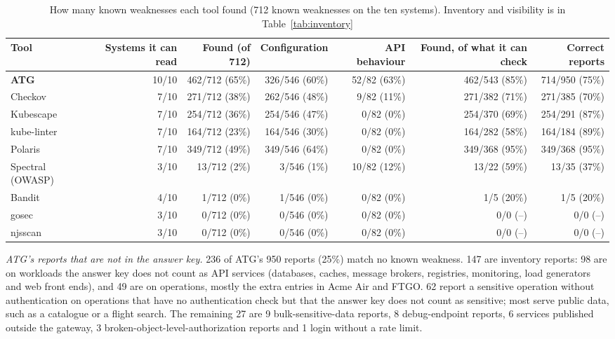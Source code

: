 \documentclass[conference]{IEEEtran}
\begin{document}
\begin{table}[!t]
\caption{How many known weaknesses each tool found (712 known weaknesses on the ten systems). Inventory and visibility is in Table~\ref{tab:inventory}}
\label{tab:tools}
\centering
\scriptsize
\setlength{\tabcolsep}{4pt}
\begin{tabular}{@{}lrrrrrr@{}}
\toprule
Tool & Systems it can read & Found (of 712) & Configuration & API behaviour & Found, of what it can check & Correct reports \\
\midrule
\textbf{ATG} & 10/10 & 462/712 (65\%) & 326/546 (60\%) & 52/82 (63\%) & 462/543 (85\%) & 714/950 (75\%) \\
Checkov & 7/10 & 271/712 (38\%) & 262/546 (48\%) & 9/82 (11\%) & 271/382 (71\%) & 271/385 (70\%) \\
Kubescape & 7/10 & 254/712 (36\%) & 254/546 (47\%) & 0/82 (0\%) & 254/370 (69\%) & 254/291 (87\%) \\
kube-linter & 7/10 & 164/712 (23\%) & 164/546 (30\%) & 0/82 (0\%) & 164/282 (58\%) & 164/184 (89\%) \\
Polaris & 7/10 & 349/712 (49\%) & 349/546 (64\%) & 0/82 (0\%) & 349/368 (95\%) & 349/368 (95\%) \\
Spectral (OWASP) & 3/10 & 13/712 (2\%) & 3/546 (1\%) & 10/82 (12\%) & 13/22 (59\%) & 13/35 (37\%) \\
Bandit & 4/10 & 1/712 (0\%) & 1/546 (0\%) & 0/82 (0\%) & 1/5 (20\%) & 1/5 (20\%) \\
gosec & 3/10 & 0/712 (0\%) & 0/546 (0\%) & 0/82 (0\%) & 0/0 (–) & 0/0 (–) \\
njsscan & 3/10 & 0/712 (0\%) & 0/546 (0\%) & 0/82 (0\%) & 0/0 (–) & 0/0 (–) \\
\bottomrule
\end{tabular}
\end{table}

\textit{ATG's reports that are not in the answer key.} 236 of ATG's 950 reports (25\%) match no known weakness. 147 are inventory reports: 98 are on workloads the answer key does not count as API services (databases, caches, message brokers, registries, monitoring, load generators and web front ends), and 49 are on operations, mostly the extra entries in Acme Air and FTGO. 62 report a sensitive operation without authentication on operations that have no authentication check but that the answer key does not count as sensitive; most serve public data, such as a catalogue or a flight search. The remaining 27 are 9 bulk-sensitive-data reports, 8 debug-endpoint reports, 6 services published outside the gateway, 3 broken-object-level-authorization reports and 1 login without a rate limit.
\end{document}
